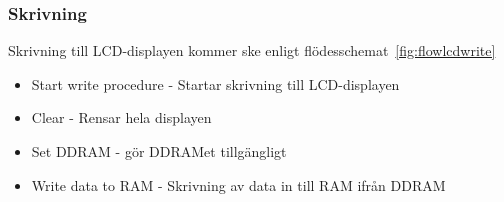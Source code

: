 \documentclass[a4paper,12pt,fleqn]{article}
\begin{document}
\newpage


\subsubsection{Skrivning}

Skrivning till LCD-displayen kommer ske enligt flödesschemat~\ref{fig:flowlcdwrite}
\begin{itemize}
  \item Start write procedure - Startar skrivning till LCD-displayen
  \item Clear - Rensar hela displayen
  \item Set DDRAM - gör DDRAMet tillgängligt
  \item Write data to RAM - Skrivning av data in till RAM ifrån DDRAM
\end{itemize}
\end{document}
